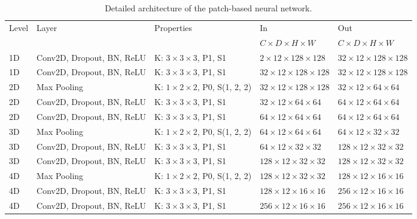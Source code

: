 \begin{sidewaystable}[htbp]
   \centering
   \caption[Architecture of FCNN 3D Patches]{Detailed architecture of the patch-based neural network.}
   \begin{tabular}{l*{4}{l}}
      \toprule
      Level	& Layer						& Properties 					& In							& Out									\\
      		&							&								& $C \times D \times H \times W$& $C \times D \times H \times W$		\\
      \midrule
      1D	& Conv2D, Dropout, BN, ReLU & K: $3 \times 3 \times 3$, P1, S1			& $2 \times 12 \times 128 \times 128$	&	$32 \times 12 \times 128 \times 128$	\\
      1D	& Conv2D, Dropout, BN, ReLU & K: $3 \times 3 \times 3$, P1, S1			& $32 \times 12 \times 128 \times 128$	&	$32 \times 12 \times 128 \times 128$	\\
      2D	& Max Pooling				& K: $1 \times 2 \times 2$, P0, S(1, 2, 2)	& $32 \times 12 \times 128 \times 128$	&	$32 \times 12 \times 64 \times 64$	\\
      2D	& Conv2D, Dropout, BN, ReLU & K: $3 \times 3 \times 3$, P1, S1			& $32 \times 12 \times 64 \times 64$	&	$64 \times 12 \times 64 \times 64$	\\
      2D	& Conv2D, Dropout, BN, ReLU & K: $3 \times 3 \times 3$, P1, S1			& $64 \times 12 \times 64 \times 64$	& 	$64 \times 12 \times 64 \times 64$	\\
      3D	& Max Pooling				& K: $1 \times 2 \times 2$, P0, S(1, 2, 2)	& $64 \times 12 \times 64 \times 64$	& 	$64 \times 12 \times 32 \times 32$		\\
      3D	& Conv2D, Dropout, BN, ReLU & K: $3 \times 3 \times 3$, P1, S1			& $64 \times 12 \times 32 \times 32$	&	$128 \times 12 \times 32 \times 32$	\\
      3D	& Conv2D, Dropout, BN, ReLU & K: $3 \times 3 \times 3$, P1, S1			& $128 \times 12 \times 32 \times 32$	&	$128 \times 12 \times 32 \times 32$	\\
      4D	& Max Pooling				& K: $1 \times 2 \times 2$, P0, S(1, 2, 2)	& $128 \times 12 \times 32 \times 32$	&	$128 \times 12 \times 16 \times 16$	\\
      4D	& Conv2D, Dropout, BN, ReLU & K: $3 \times 3 \times 3$, P1, S1			& $128 \times 12 \times 16 \times 16$	&	$256 \times 12 \times 16 \times 16$	\\
      4D	& Conv2D, Dropout, BN, ReLU & K: $3 \times 3 \times 3$, P1, S1			& $256 \times 12 \times 16 \times 16$	&	$256 \times 12 \times 16 \times 16$	\\
      

\end{tabular}
\end{sidewaystable}
